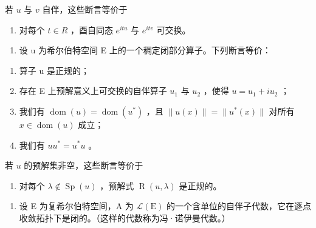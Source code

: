 若 \(u\) 与 \(v\) 自伴，这些断言等价于

\begin{enumerate}
\def\labelenumi{\alph{enumi})}
\setcounter{enumi}{3}
\tightlist
\item
  对每个 \(t \in R\) ，酉自同态 \(e^{itu}\) 与 \(e^{itv}\) 可交换。
\end{enumerate}

\begin{enumerate}
\def\labelenumi{\arabic{enumi})}
\setcounter{enumi}{8}
\tightlist
\item
  设 u 为希尔伯特空间 E 上的一个稠定闭部分算子。下列断言等价：
\end{enumerate}

\begin{enumerate}
\def\labelenumi{\alph{enumi})}
\item
  算子 u 是正规的；
\item
  存在 E 上预解意义上可交换的自伴算子 \(u_{1}\) 与 \(u_{2}\) ，使得 \(u = u_{1} + iu_{2}\) ；
\item
  我们有 \(\operatorname{dom}(u) = \operatorname{dom}(u^*)\) ，且 \(\| u(x)\| = \| u^{*}(x)\|\) 对所有 \(x\in \operatorname{dom}(u)\) 成立；
\item
  我们有 \(uu^{*} = u^{*}u\) 。
\end{enumerate}

若 \(u\) 的预解集非空，这些断言等价于

\begin{enumerate}
\def\labelenumi{\alph{enumi})}
\setcounter{enumi}{4}
\tightlist
\item
  对每个 \(\lambda \notin \operatorname{Sp}(u)\) ，预解式 \(\operatorname{R}(u, \lambda)\) 是正规的。
\end{enumerate}

\begin{enumerate}
\def\labelenumi{\arabic{enumi})}
\setcounter{enumi}{9}
\tightlist
\item
  设 E 为复希尔伯特空间，A 为 \(\mathcal{L}(\mathrm{E})\) 的一个含单位的自伴子代数，它在逐点收敛拓扑下是闭的。（这样的代数称为冯·诺伊曼代数。）
\end{enumerate}

